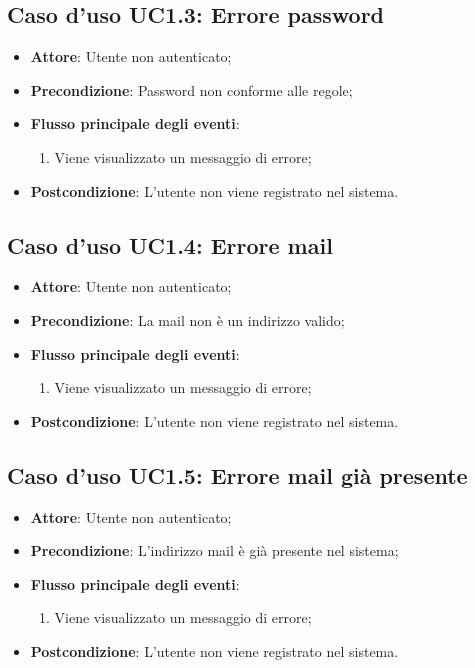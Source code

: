 \documentclass[12pt,a4paper]{article}
\begin{document}
\subsection{Caso d'uso UC1.3: Errore password}

\begin{itemize}

\item \textbf{Attore}: Utente non autenticato; 
\item \textbf{Precondizione}: Password non conforme alle regole;

\item \textbf{Flusso principale degli eventi}:
\begin{enumerate}
	\item Viene visualizzato un messaggio di errore;
	
\end{enumerate}
\item \textbf{Postcondizione}: L'utente non viene registrato nel sistema.
\end{itemize}
\hypertarget{UC1.4}{}
\subsection{Caso d'uso UC1.4: Errore mail}

\begin{itemize}

\item \textbf{Attore}: Utente non autenticato; 
\item \textbf{Precondizione}: La mail non è un indirizzo valido;

\item \textbf{Flusso principale degli eventi}:
\begin{enumerate}
	\item Viene visualizzato un messaggio di errore;
	
\end{enumerate}
\item \textbf{Postcondizione}: L'utente non viene registrato nel sistema.
\end{itemize}
\hypertarget{UC1.5}{}
\subsection{Caso d'uso UC1.5: Errore mail già presente}

\begin{itemize}

\item \textbf{Attore}: Utente non autenticato; 
\item \textbf{Precondizione}: L'indirizzo mail è già presente nel sistema;

\item \textbf{Flusso principale degli eventi}:
\begin{enumerate}
	\item Viene visualizzato un messaggio di errore;
	
\end{enumerate}
\item \textbf{Postcondizione}: L'utente non viene registrato nel sistema.
\end{itemize}
\hypertarget{UC1.6}{}
\end{document}
